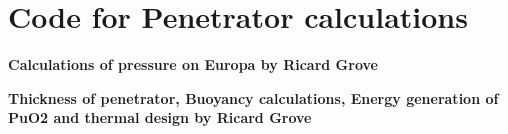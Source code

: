 \chapter{Code for Penetrator calculations}\label{app:ricard}

\textbf{Calculations of pressure on Europa by Ricard Grove}


\newpage
\noindent
\textbf{Thickness of penetrator, Buoyancy calculations, Energy generation of PuO2 and thermal design by Ricard Grove}

